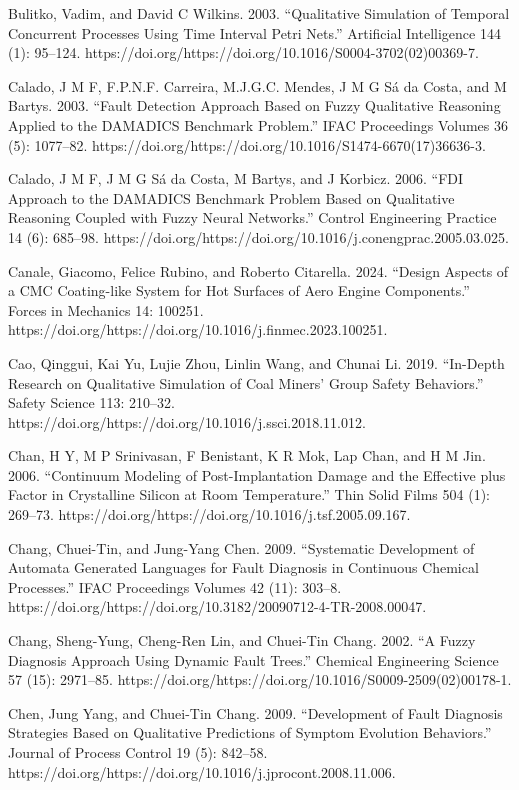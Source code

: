 \documentclass[utf8]{gradu3}
\begin{document}
Bulitko, Vadim, and David C Wilkins. 2003. “Qualitative Simulation of Temporal Concurrent Processes Using Time Interval Petri Nets.” Artificial Intelligence 144 (1): 95–124. https://doi.org/https://doi.org/10.1016/S0004-3702(02)00369-7.

Calado, J M F, F.P.N.F. Carreira, M.J.G.C. Mendes, J M G Sá da Costa, and M Bartys. 2003. “Fault Detection Approach Based on Fuzzy Qualitative Reasoning Applied to the DAMADICS Benchmark Problem.” IFAC Proceedings Volumes 36 (5): 1077–82. https://doi.org/https://doi.org/10.1016/S1474-6670(17)36636-3.

Calado, J M F, J M G Sá da Costa, M Bartys, and J Korbicz. 2006. “FDI Approach to the DAMADICS Benchmark Problem Based on Qualitative Reasoning Coupled with Fuzzy Neural Networks.” Control Engineering Practice 14 (6): 685–98. https://doi.org/https://doi.org/10.1016/j.conengprac.2005.03.025.

Canale, Giacomo, Felice Rubino, and Roberto Citarella. 2024. “Design Aspects of a CMC Coating-like System for Hot Surfaces of Aero Engine Components.” Forces in Mechanics 14: 100251. https://doi.org/https://doi.org/10.1016/j.finmec.2023.100251.

Cao, Qinggui, Kai Yu, Lujie Zhou, Linlin Wang, and Chunai Li. 2019. “In-Depth Research on Qualitative Simulation of Coal Miners’ Group Safety Behaviors.” Safety Science 113: 210–32. https://doi.org/https://doi.org/10.1016/j.ssci.2018.11.012.

Chan, H Y, M P Srinivasan, F Benistant, K R Mok, Lap Chan, and H M Jin. 2006. “Continuum Modeling of Post-Implantation Damage and the Effective plus Factor in Crystalline Silicon at Room Temperature.” Thin Solid Films 504 (1): 269–73. https://doi.org/https://doi.org/10.1016/j.tsf.2005.09.167.

Chang, Chuei-Tin, and Jung-Yang Chen. 2009. “Systematic Development of Automata Generated Languages for Fault Diagnosis in Continuous Chemical Processes.” IFAC Proceedings Volumes 42 (11): 303–8. https://doi.org/https://doi.org/10.3182/20090712-4-TR-2008.00047.

Chang, Sheng-Yung, Cheng-Ren Lin, and Chuei-Tin Chang. 2002. “A Fuzzy Diagnosis Approach Using Dynamic Fault Trees.” Chemical Engineering Science 57 (15): 2971–85. https://doi.org/https://doi.org/10.1016/S0009-2509(02)00178-1.

Chen, Jung Yang, and Chuei-Tin Chang. 2009. “Development of Fault Diagnosis Strategies Based on Qualitative Predictions of Symptom Evolution Behaviors.” Journal of Process Control 19 (5): 842–58. https://doi.org/https://doi.org/10.1016/j.jprocont.2008.11.006.
\end{document}
